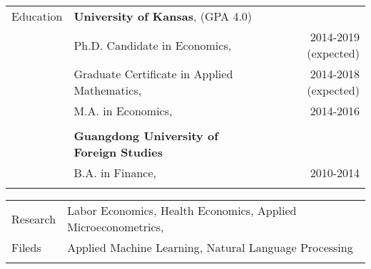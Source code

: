 \documentclass[letterpaper, 11pt]{article}
\begin{document}
\vspace{8mm}


\noindent \begin{tabular}{@{} p{3cm} p{10cm} r}
	\Large{Education}    & \textbf{University of Kansas}, (GPA 4.0)\\
	& \hspace{5mm}Ph.D. Candidate in Economics, & 2014-2019 (expected) \\
	& \hspace{5mm}Graduate Certificate in Applied Mathematics, & 2014-2018 (expected) \\
	& \hspace{5mm}M.A. in Economics, & 2014-2016 \\
	& \\
	& \textbf{Guangdong University of Foreign Studies} \\
	& \hspace{5mm}B.A. in Finance, & 2010-2014 \\
	& \\
\end{tabular}





\noindent \begin{tabular}{@{} p{3cm} l}
	\Large{Research}  & Labor Economics, Health Economics, Applied Microeconometrics, \\
	\Large{Fileds} & Applied Machine Learning, Natural Language Processing \\
	& \\
\end{tabular}
\end{document}
